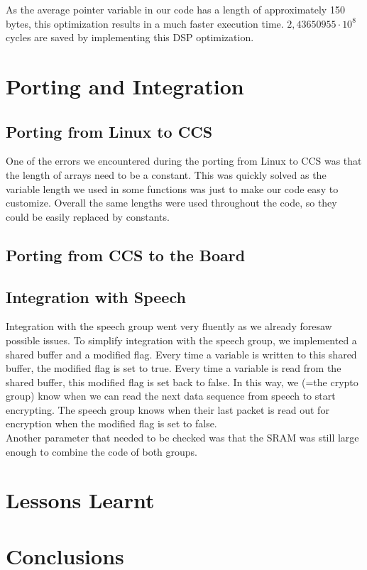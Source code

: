 \documentclass[a4paper]{article}
\begin{document}
As the average pointer variable in our code has a length of approximately 150 bytes, this optimization results in a much faster execution time. $2,43650955\cdot10^{8}$ cycles are saved by implementing this DSP optimization.

\section{Porting and Integration}

\subsection{Porting from Linux to CCS}
One of the errors we encountered during the porting from Linux to CCS was that the length of arrays need to be a constant. This was quickly solved as the variable length we used in some functions was just to make our code easy to customize. Overall the same lengths were used throughout the code, so they could be easily replaced by constants.\\

\subsection{Porting from CCS to the Board}

\subsection{Integration with Speech}
Integration with the speech group went very fluently as we already foresaw possible issues. To simplify integration with the speech group, we implemented a shared buffer and a modified flag. Every time a variable is written to this shared buffer, the modified flag is set to true. Every time a variable is read from the shared buffer, this modified flag is set back to false. In this way, we (=the crypto group) know when we can read the next data sequence from speech to start encrypting. The speech group knows when their last packet is read out for encryption when the modified flag is set to false.\\

Another parameter that needed to be checked was that the SRAM was still large enough to combine the code of both groups.\\

\section{Lessons Learnt}

\section{Conclusions}
\end{document}
